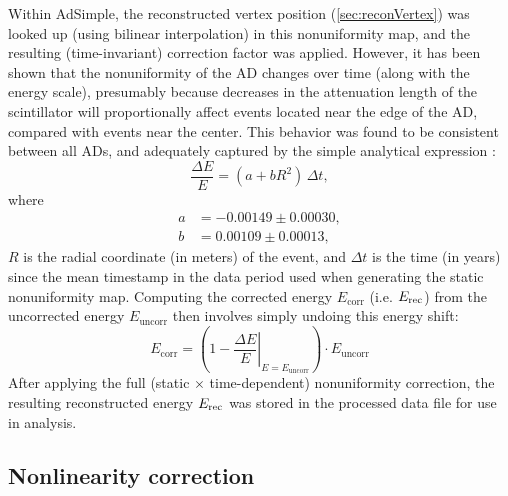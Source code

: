 \documentclass[../thesis.tex]{subfiles}
\begin{document}
Within AdSimple, the reconstructed vertex position (\autoref{sec:reconVertex}) was looked up (using bilinear interpolation) in this nonuniformity map, and the resulting (time-invariant) correction factor was applied. However, it has been shown that the nonuniformity of the AD changes over time (along with the energy scale), presumably because decreases in the attenuation length of the scintillator will proportionally affect events located near the edge of the AD, compared with events near the center. This behavior was found to be consistent between all ADs, and adequately captured by the simple analytical expression \cite[p. 16]{yuryNonUni2}:
\begin{equation}
  \frac{\Delta E}{E} = (a + b R^2)\, \Delta t,
\end{equation}
where
\begin{align*}
  a &= -0.00149 \pm 0.00030,\\
  b &= 0.00109 \pm 0.00013,
\end{align*}
$R$ is the radial coordinate (in meters) of the event, and $\Delta t$ is the time (in years) since the mean timestamp in the data period used when generating the static nonuniformity map. Computing the corrected energy $E_{\mathrm{corr}}$ (i.e. $E_\mathrm{rec}$) from the uncorrected energy $E_{\mathrm{uncorr}}$ then involves simply undoing this energy shift:
\begin{equation}
  E_{\mathrm{corr}} = \left( 1 - \left.\frac{\Delta E}{E}\right|_{E=E_{\mathrm{uncorr}}} \right) \cdot E_{\mathrm{uncorr}}
\end{equation}
After applying the full (static $\times$ time-dependent) nonuniformity correction, the resulting reconstructed energy $E_\mathrm{rec}$ was stored in the processed data file for use in analysis.

\subsection{Nonlinearity correction}
\label{sec:reconEnergyNL}
\end{document}
